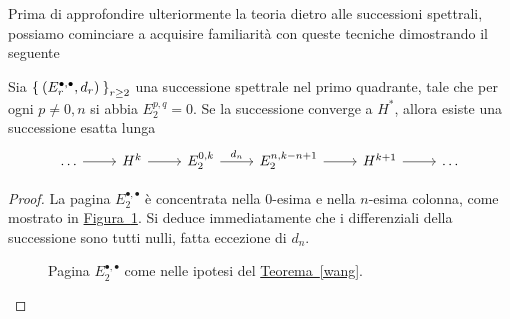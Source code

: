 \begin{ex}
	Prima di approfondire ulteriormente la teoria dietro alle successioni spettrali,
	possiamo cominciare a acquisire familiarità con queste tecniche dimostrando il
	seguente
	\begin{thm}\label{wang}
		Sia $\Set{(E_{r}^{\bullet,\bullet},d_{r})}_{r \ge 2}$
		una successione spettrale nel primo quadrante, tale che
		per ogni $p \ne 0,n$ si abbia $E_{2}^{p,q} = 0$.
		Se la successione converge a $H^{*}$, allora esiste una successione esatta lunga
		\begin{equation*}
			\begin{tikzcd}
				\dots \ar[r]
				& H^{k} \ar[r]
				& E^{0,k}_{2} \ar[r, "d_{n}"]
				& E^{n,k-n+1}_{2} \ar[r]
				& H^{k+1} \ar[r]
				& \dots
			\end{tikzcd}
		\end{equation*}
		\begin{proof}
			La pagina $E_{2}^{\bullet,\bullet}$ è concentrata
			nella $0$-esima e nella $n$-esima colonna, come mostrato in
			\hyperref[wang-e2]{Figura~\ref{wang-e2}}.
			Si deduce immediatamente che i differenziali della successione
			sono tutti nulli, fatta eccezione di $d_{n}$.
			
	\begin{figure}
		\centering
		\caption{Pagina $E^{\bullet,\bullet}_{2}$ come nelle ipotesi del \hyperref[wang]{Teorema~\ref{wang}}.}
    	\label{wang-e2}
	\end{figure}
			

\end{proof}
\end{thm}
\end{ex}
